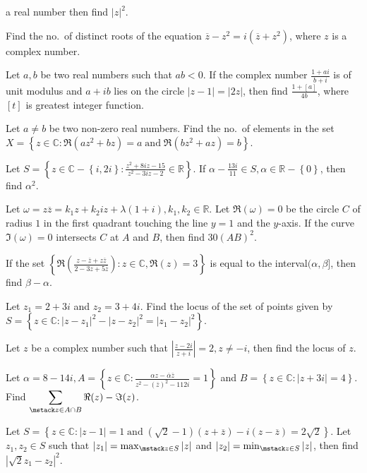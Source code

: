   a real number then find $|z|^2$.
\item Find the no.\ of distinct roots of the equation $\overline{z} - z^2 = i(\overline{z} + z^2)$, where
  $z$ is a complex number.
\item Let $a, b$ be two real numbers such that $ab < 0$. If the complex number $\frac{1 + ai}{b + i}$ is of
  unit modulus and $a + ib$ lies on the circle $|z - 1| = |2z|$, then find $\frac{1 + [a]}{4b}$, where $[t]$
  is greatest integer function.
\item Let $a\neq b$ be two non-zero real numbers. Find the no.\ of elements in the set $X
  = \left\{z\in\mathbb{C}: \Re(az^2 +bz) = a\mathrm{\;and\;} \Re(bz^2 + az) = b\right\}$.
\item Let $S = \left\{z\in\mathbb{C} - \left\{i, 2i\right\}: \frac{z^2 + 8iz - 15}{z^2 - 3iz -
  2}\in\mathbb{R}\right\}$. If $\alpha - \frac{13i}{11}\in S, \alpha\in\mathbb{R} - \left\{0\right\}$, then
  find $\alpha^2$.
\item Let $\omega = z\overline{z} = k_1z + k_2iz + \lambda(1 + i), k_1, k_2\in\mathbb{R}$. Let $\Re(\omega)
  = 0$ be the circle $C$ of radius $1$ in the first quadrant touching the line $y = 1$ and the $y$-axis. If
  the curve $\Im(\omega) = 0$ intersects $C$ at $A$ and $B$, then find $30(AB)^2$.
\item If the set $\left\{\Re\left(\frac{z - \overline{z} + z\overline{z}}{2 - 3z + 5\overline{z}}\right):
  z\in\mathbb{C}, \Re(z) = 3\right\}$ is equal to the interval$(\alpha, \beta]$, then find $\beta - \alpha$.
\item Let $z_1 = 2 + 3i$ and $z_2 = 3 + 4i$. Find the locus of the set of points given by $S
  = \left\{z\in\mathbb{C}: |z - z_1|^2 - |z - z_2|^2 = |z_1 - z_2|^2\right\}$.
\item Let $z$ be a complex number such that $\left|\frac{z - 2i}{z + i}\right| = 2, z\neq -i$, then find the
  locus of $z$.
\item Let $\alpha = 8 - 14i, A = \left\{z\in\mathbb{C}: \frac{\alpha z - \overline{\alpha}\overline{z}}{z^2
  - (\overline{z})^2 - 112i} = 1\right\}$ and $B = \left\{z\in\mathbb{C}: |z + 3i| = 4\right\}$. Find
  $\displaystyle\sum_{\mstack z\in A\cap B} \Re(z) - \Im(z)$.
\item Let $S = \left\{z\in\mathbb{C}: |z - 1| = 1 \mathrm{\;and\;} (\sqrt{2} - 1)(z + \overline{z}) - i(z
  - \overline{z}) = 2\sqrt{2}\right\}$. Let $z_1, z_2\in S$ such that $|z_1| = \max_{\mstack z\in S}|z|$ and
  $|z_2| = \min_{\mstack z\in S}|z|$, then find $|\sqrt{2}z_1 - z_2|^2$.
